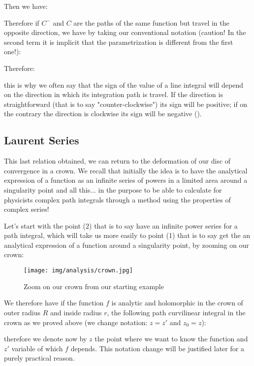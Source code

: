 	Then we have:
	
	Therefore if $C^-$ and $C$ are the paths of the same function but travel in the opposite direction, we have by taking our conventional notation (caution! In the second term it is implicit that the parametrization is different from the first one!):
	
	Therefore:
	
	this is why we often say that the sign of the value of a line integral will depend on the direction in which its integration path is travel. If the direction is straightforward (that is to say "counter-clockwise") its sign will be positive; if on the contrary the direction is clockwise its sign will be negative ().
	
	\pagebreak
	\subsection{Laurent Series}
	This last relation obtained, we can return to the deformation of our disc of convergence in a crown. We recall that initially the idea is to have the analytical expression of a function as an infinite series of powers in a limited area around a singularity point and all this... in the purpose to be able to calculate for physicists complex path integrals through a method using the properties of complex series!
	
	Let's start with the point (2) that is to say have an infinite power series for a path integral, which will take us more easily to point (1) that is to say get the an analytical expression of a function around a singularity point, by zooming on our crown:
	
	\begin{figure}[H]
		\begin{center}
			\texttt{[image: img/analysis/crown.jpg]}
		\end{center}	
		\caption[]{Zoom on our crown from our starting example}
	\end{figure}
	We therefore have if the function $f$ is analytic and holomorphic in the crown of outer radius $R$ and inside radius $r$, the following path curvilinear integral in the crown as we proved above (we change notation: $z=z'$ and $z_0=z$):
	
	
	therefore we denote now by $z$ the point where we want to know the function and $z'$ variable of which $f$ depends. This notation change will be justified later for a purely practical reason.
	
